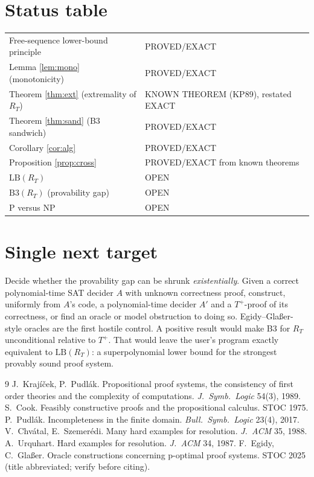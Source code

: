 \documentclass[11pt]{article}
\theoremstyle{definition}
\theoremstyle{remark}
\begin{document}
\section*{Status table}
\begin{tabular}{ll}
Free-sequence lower-bound principle & PROVED/EXACT\\
Lemma \ref{lem:mono} (monotonicity) & PROVED/EXACT\\
Theorem \ref{thm:ext} (extremality of $R_T$) & KNOWN THEOREM (KP89), restated EXACT\\
Theorem \ref{thm:sand} (B3 sandwich) & PROVED/EXACT\\
Corollary \ref{cor:alg} & PROVED/EXACT\\
Proposition \ref{prop:cross} & PROVED/EXACT from known theorems\\
$\mathrm{LB}(R_T)$ & OPEN\\
$\mathrm{B3}(R_T)$ (provability gap) & OPEN\\
P versus NP & OPEN
\end{tabular}

\section*{Single next target}
Decide whether the provability gap can be shrunk \emph{existentially}. Given a correct
polynomial-time SAT decider $A$ with unknown correctness proof, construct, uniformly from $A$'s
code, a polynomial-time decider $A'$ and a $T^{+}$-proof of its correctness, or find an oracle or
model obstruction to doing so. Egidy--Glaßer-style oracles are the first hostile control. A
positive result would make B3 for $R_T$ unconditional relative to $T^{+}$. That would leave the
user's program exactly equivalent to $\mathrm{LB}(R_T)$: a superpolynomial lower bound for the
strongest provably sound proof system.

\begin{thebibliography}{9}
 J.~Krajíček, P.~Pudlák. Propositional proof systems, the consistency of first
order theories and the complexity of computations. \emph{J.\ Symb.\ Logic} 54(3), 1989.
 S.~Cook. Feasibly constructive proofs and the propositional calculus. STOC 1975.
 P.~Pudlák. Incompleteness in the finite domain. \emph{Bull.\ Symb.\ Logic} 23(4), 2017.
 V.~Chvátal, E.~Szemerédi. Many hard examples for resolution. \emph{J.\ ACM} 35, 1988.
 A.~Urquhart. Hard examples for resolution. \emph{J.\ ACM} 34, 1987.
 F.~Egidy, C.~Glaßer. Oracle constructions concerning p-optimal proof systems. STOC 2025 (title abbreviated; verify before citing).
\end{thebibliography}
\end{document}
